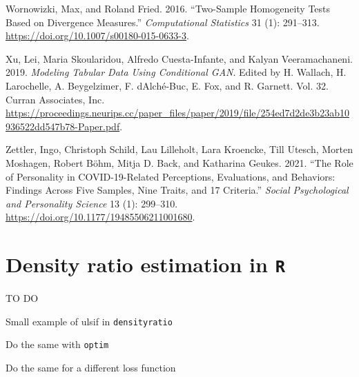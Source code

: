 \documentclass[
]{article}
\newlength{\cslhangindent}
\newlength{\cslentryspacingunit} %
\newenvironment{CSLReferences}[2] %
 {%
  \setlength{\parindent}{0pt}
  \ifodd #1
  \let\oldpar\par
  \def\par{\hangindent=\cslhangindent\oldpar}
  \fi
  \setlength{\parskip}{#2\cslentryspacingunit}
 }%
 {}
\begin{document}
\begin{CSLReferences}{1}{0}
\leavevmode{}%
Wornowizki, Max, and Roland Fried. 2016. {``Two-Sample Homogeneity Tests
Based on Divergence Measures.''} \emph{Computational Statistics} 31 (1):
291--313. \url{https://doi.org/10.1007/s00180-015-0633-3}.

\leavevmode{}%
Xu, Lei, Maria Skoularidou, Alfredo Cuesta-Infante, and Kalyan
Veeramachaneni. 2019. \emph{Modeling Tabular Data Using Conditional
GAN}. Edited by H. Wallach, H. Larochelle, A. Beygelzimer, F.
dAlché-Buc, E. Fox, and R. Garnett. Vol. 32. Curran Associates, Inc.
\url{https://proceedings.neurips.cc/paper_files/paper/2019/file/254ed7d2de3b23ab10936522dd547b78-Paper.pdf}.

\leavevmode{}%
Zettler, Ingo, Christoph Schild, Lau Lilleholt, Lara Kroencke, Till
Utesch, Morten Moshagen, Robert Böhm, Mitja D. Back, and Katharina
Geukes. 2021. {``The Role of Personality in COVID-19-Related
Perceptions, Evaluations, and Behaviors: Findings Across Five Samples,
Nine Traits, and 17 Criteria.''} \emph{Social Psychological and
Personality Science} 13 (1): 299--310.
\url{https://doi.org/10.1177/19485506211001680}.

\end{CSLReferences}

\setcounter{section}{0}
\renewcommand{\thesection}{\Alph{section}}

\setcounter{table}{0}
\renewcommand{\thetable}{A\arabic{table}}

\setcounter{figure}{0}
\renewcommand{\thefigure}{A\arabic{figure}}

\hypertarget{sec-app-A}{%
\section{\texorpdfstring{Density ratio estimation in
\texttt{R}}{Density ratio estimation in R}}\label{sec-app-A}}

TO DO

Small example of ulsif in \texttt{densityratio}

Do the same with \texttt{optim}

Do the same for a different loss function
\end{document}
